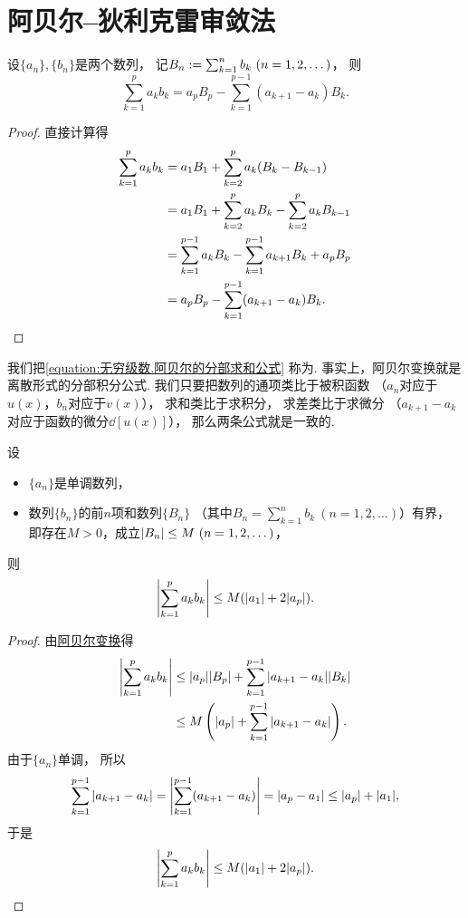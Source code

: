 \section{阿贝尔--狄利克雷审敛法}
\begin{lemma}[阿贝尔变换]
设\(\{a_n\},\{b_n\}\)是两个数列，
记\(B_n \defeq \sum_{k=1}^n b_k\ (n=1,2,\dotsc)\)，
则\begin{equation}\label{equation:无穷级数.阿贝尔的分部求和公式}
	\sum_{k=1}^p a_k b_k
	= a_p B_p - \sum_{k=1}^{p-1} (a_{k+1} - a_k) B_k.
\end{equation}
\begin{proof}
直接计算得\begin{align*}
	\sum_{k=1}^p a_k b_k
	&= a_1 B_1 + \sum_{k=2}^p a_k (B_k - B_{k-1}) \\
	&= a_1 B_1 + \sum_{k=2}^p a_k B_k - \sum_{k=2}^p a_k B_{k-1} \\
	&= \sum_{k=1}^{p-1} a_k B_k - \sum_{k=1}^{p-1} a_{k+1} B_k + a_p B_p \\
	&= a_p B_p - \sum_{k=1}^{p-1} (a_{k+1} - a_k) B_k.
	\qedhere
\end{align*}
\end{proof}
\end{lemma}
我们把\cref{equation:无穷级数.阿贝尔的分部求和公式} 称为.
事实上，阿贝尔变换就是离散形式的分部积分公式.
我们只要把数列的通项类比于被积函数
（\(a_n\)对应于\(u(x)\)，\(b_n\)对应于\(v(x)\)），
求和类比于求积分，
求差类比于求微分
（\(a_{k+1} - a_k\)对应于函数的微分\(\dd{[u(x)]}\)），
那么两条公式就是一致的.

\begin{lemma}\label{theorem:无穷级数.阿贝尔引理}
设\begin{itemize}
	\item \(\{a_n\}\)是单调数列，
	\item 数列\(\{b_n\}\)的前\(n\)项和数列\(\{B_n\}\)
	（其中\(B_n = \sum_{k=1}^n b_k\ (n=1,2,\dotsc)\)）有界，
	即存在\(M>0\)，成立\(\abs{B_n} \leq M\ (n=1,2,\dotsc)\)，
\end{itemize}
则\[
	\abs{\sum_{k=1}^p a_k b_k}
	\leq M(\abs{a_1} + 2 \abs{a_p}).
\]
\begin{proof}
由\hyperref[equation:无穷级数.阿贝尔的分部求和公式]{阿贝尔变换}得\begin{align*}
	\abs{\sum_{k=1}^p a_k b_k}
	&\leq \abs{a_p} \abs{B_p} + \sum_{k=1}^{p-1} \abs{a_{k+1} - a_k} \abs{B_k} \\
	&\leq M \left(
		\abs{a_p}
		+ \sum_{k=1}^{p-1} \abs{a_{k+1} - a_k}
	\right).
\end{align*}
由于\(\{a_n\}\)单调，
所以\[
	\sum_{k=1}^{p-1} \abs{a_{k+1} - a_k}
	= \abs{\sum_{k=1}^{p-1} (a_{k+1} - a_k)}
	= \abs{a_p - a_1}
	\leq \abs{a_p} + \abs{a_1},
\]
于是\[
	\abs{\sum_{k=1}^p a_k b_k}
	\leq M(\abs{a_1} + 2 \abs{a_p}).
	\qedhere
\]
\end{proof}
\end{lemma}

